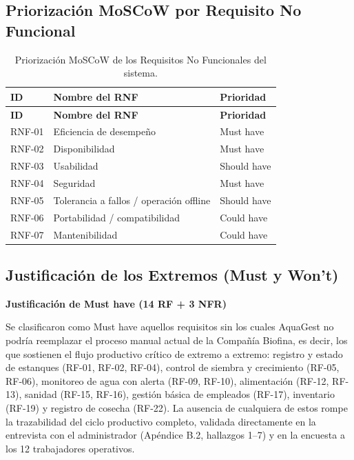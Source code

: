 \documentclass[11pt,a4paper]{article}
\begin{document}
\begin{longtable}{|p{2cm}|p{8cm}|p{4cm}|}
\end{longtable}


\subsection{Priorización MoSCoW por Requisito No Funcional}

\begin{longtable}{|p{2cm}|p{8cm}|p{4cm}|}
\caption{Priorización MoSCoW de los Requisitos No Funcionales del sistema.}
\label{tab:moscow-rnf} \\
\hline

\textbf{ID} & \textbf{Nombre del RNF} & \textbf{Prioridad} \\
\hline

\endfirsthead

\hline
\textbf{ID} & \textbf{Nombre del RNF} & \textbf{Prioridad} \\
\hline
\endhead

\hline
\endfoot

\hline
\endlastfoot

RNF-01 & Eficiencia de desempeño & Must have \\
\hline
RNF-02 & Disponibilidad & Must have \\
\hline
RNF-03 & Usabilidad & Should have \\
\hline
RNF-04 & Seguridad & Must have \\
\hline
RNF-05 & Tolerancia a fallos / operación offline & Should have \\
\hline
RNF-06 & Portabilidad / compatibilidad & Could have \\
\hline
RNF-07 & Mantenibilidad & Could have \\
\hline

\end{longtable}


\subsection{Justificación de los Extremos (Must y Won't)}
\textbf{Justificación de Must have (14 RF + 3 NFR)}

Se clasificaron como Must have aquellos requisitos sin los cuales AquaGest no podría reemplazar el proceso manual actual de la Compañía Biofina, es decir, los que sostienen el flujo productivo crítico de extremo a extremo: registro y estado de estanques (RF-01, RF-02, RF-04), control de siembra y crecimiento (RF-05, RF-06), monitoreo de agua con alerta (RF-09, RF-10), alimentación (RF-12, RF-13), sanidad (RF-15, RF-16), gestión básica de empleados (RF-17), inventario (RF-19) y registro de cosecha (RF-22). La ausencia de cualquiera de estos rompe la trazabilidad del ciclo productivo completo, validada directamente en la entrevista con el administrador (Apéndice B.2, hallazgos 1–7) y en la encuesta a los 12 trabajadores operativos.
\end{document}
